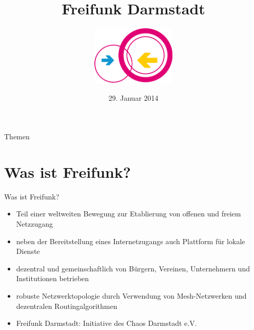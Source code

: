\documentclass[]{beamer}
\title{Freifunk Darmstadt}
\author{\includegraphics[width=4cm]{../global/images/freifunk_logo}}
\date{29. Januar 2014}
\begin{document}
\begin{frame}
\maketitle
\end{frame}


\begin{frame}{Themen}
\tableofcontents
\end{frame}

\section{Was ist Freifunk?}
\begin{frame}{Was ist Freifunk?}
\begin{itemize}
	\item Teil einer weltweiten Bewegung zur Etablierung von offenen und freiem Netzzugang \pause
	\item neben der Bereitstellung eines Internetzugangs auch Plattform für lokale Dienste \pause
	\item dezentral und gemeinschaftlich von Bürgern, Vereinen, Unternehmern und Institutionen betrieben \pause
	\item robuste Netzwerktopologie durch Verwendung von Mesh-Netzwerken und dezentralen Routingalgorithmen \pause
	\item Freifunk Darmstadt: Initiative des Chaos Darmstadt e.V.
\end{itemize}
\end{frame}
\end{document}
